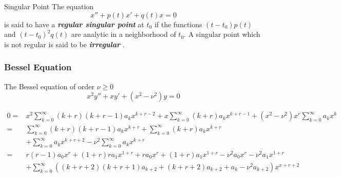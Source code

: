 \documentclass{beamer}
\begin{document}
\begin{frame}
\begin{block}{Singular Point}
The equation
$$x''+ p(t)x'+ q(t)x = 0$$
is said to have a \textcolor[rgb]{0,0.6,0.3}{\textbf{\textit{regular singular point}}} at $t_0$ if the functions $(t - t_0)p(t)$ and $(t - t_0)^2q(t)$ are analytic in a neighborhood of $t_0$. A singular point which is not regular is said to be \textcolor[rgb]{0,0.6,0.3}{\textbf{\textit{irregular}}} .
\end{block}
\end{frame}

\begin{frame}
\frametitle{Bessel Equation}
The Bessel equation of order $ \nu\geqslant0$
$$x^2y''+xy'+(x^2-\nu^2)y=0$$

\end{frame}

\begin{frame}

\footnotesize
\begin{align*}
0=&x^2\sum\limits_{k=0}^{\infty}(k+r)(k+r-1)a_kx^{k+r-2}
+x\sum\limits_{k=0}^{\infty}(k+r)a_kx^{k+r-1}+(x^2-\nu^2)x^r\sum\limits_{k=0}^{\infty}a_kx^k\\
=&\sum\limits_{k=0}^{\infty}(k+r)(k+r-1)a_kx^{k+r}+\sum\limits_{k=0}^{\infty}(k+r)a_kx^{k+r}\\
&+\sum\limits_{k=0}^{\infty}a_kx^{k+r+2}-\nu^2\sum\limits_{k=0}^{\infty}a_kx^{k+r}\\
=&r(r-1)a_0x^r+(1+r)ra_1x^{1+r}+ra_0x^r+(1+r)a_1x^{1+r}-\nu^2a_0x^r-\nu^2a_1x^{1+r}\\
&+\sum\limits_{k=0}^{\infty}((k+r+2)(k+r+1)a_{k+2}+(k+r+2)a_{k+2}+a_k-\nu^2a_{k+2})x^{x+r+2}
\end{align*}

\end{frame}
\end{document}
